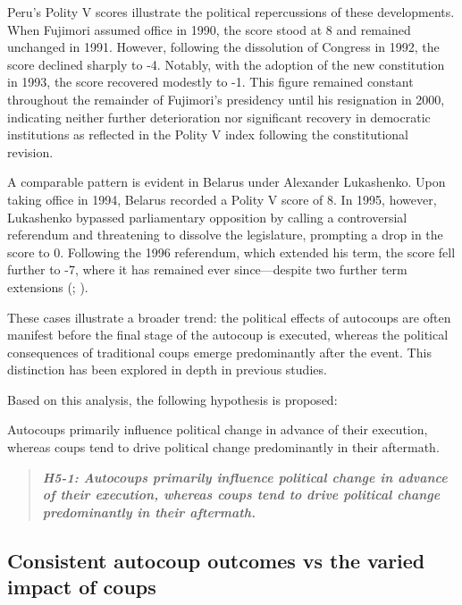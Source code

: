 \documentclass[
  12pt,
]{report}
\begin{document}
Peru's Polity V scores illustrate the political repercussions of these
developments. When Fujimori assumed office in 1990, the score stood at 8
and remained unchanged in 1991. However, following the dissolution of
Congress in 1992, the score declined sharply to -4. Notably, with the
adoption of the new constitution in 1993, the score recovered modestly
to -1. This figure remained constant throughout the remainder of
Fujimori's presidency until his resignation in 2000, indicating neither
further deterioration nor significant recovery in democratic
institutions as reflected in the Polity V index following the
constitutional revision.

A comparable pattern is evident in Belarus under Alexander Lukashenko.
Upon taking office in 1994, Belarus recorded a Polity V score of 8. In
1995, however, Lukashenko bypassed parliamentary opposition by calling a
controversial referendum and threatening to dissolve the legislature,
prompting a drop in the score to 0. Following the 1996 referendum, which
extended his term, the score fell further to -7, where it has remained
ever since---despite two further term extensions
(; ).

These cases illustrate a broader trend: the political effects of
autocoups are often manifest before the final stage of the autocoup is
executed, whereas the political consequences of traditional coups emerge
predominantly after the event. This distinction has been explored in
depth in previous studies.

Based on this analysis, the following hypothesis is proposed:

Autocoups primarily influence political change in advance of their
execution, whereas coups tend to drive political change predominantly in
their aftermath.

\begin{quote}
\textbf{\emph{H5-1: Autocoups primarily influence political change in
advance of their execution, whereas coups tend to drive political change
predominantly in their aftermath.}}
\end{quote}

\subsection*{Consistent autocoup outcomes vs the varied impact of
coups}\label{consistent-autocoup-outcomes-vs-the-varied-impact-of-coups}
\end{document}
